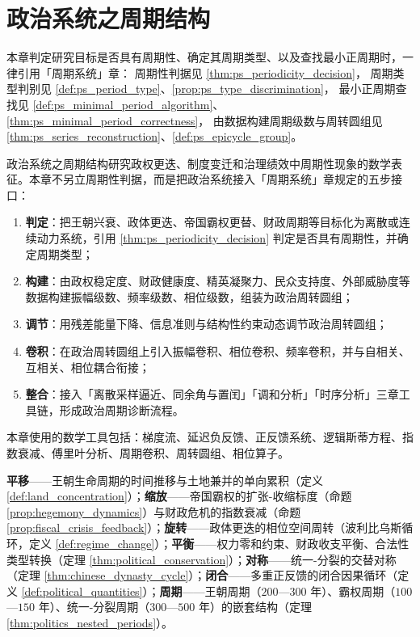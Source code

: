\chapter{政治系统之周期结构}

\begin{remark}[本章目标的周期性判定（引用）]\label{rem:politics_ps_hook}
本章判定研究目标是否具有周期性、确定其周期类型、以及查找最小正周期时，一律引用「周期系统」章：
周期性判据见 \cref{thm:ps_periodicity_decision}，
周期类型判别见 \cref{def:ps_period_type}、\cref{prop:ps_type_discrimination}，
最小正周期查找见 \cref{def:ps_minimal_period_algorithm}、\cref{thm:ps_minimal_period_correctness}，
由数据构建周期级数与周转圆组见 \cref{thm:ps_series_reconstruction}、\cref{def:ps_epicycle_group}。
\end{remark}

\begin{remark}\label{rem:politics_five_steps_positioning}
政治系统之周期结构研究政权更迭、制度变迁和治理绩效中周期性现象的数学表征。本章不另立周期性判据，而是把政治系统接入「周期系统」章规定的五步接口：
\begin{enumerate}[label=(\arabic*)]
    \item \textbf{判定}：把王朝兴衰、政体更迭、帝国霸权更替、财政周期等目标化为离散或连续动力系统，引用 \cref{thm:ps_periodicity_decision} 判定是否具有周期性，并确定周期类型；
    \item \textbf{构建}：由政权稳定度、财政健康度、精英凝聚力、民众支持度、外部威胁度等数据构建振幅级数、频率级数、相位级数，组装为政治周转圆组；
    \item \textbf{调节}：用残差能量下降、信息准则与结构性约束动态调节政治周转圆组；
    \item \textbf{卷积}：在政治周转圆组上引入振幅卷积、相位卷积、频率卷积，并与自相关、互相关、相位耦合衔接；
    \item \textbf{整合}：接入「离散采样逼近、同余角与置闰」「调和分析」「时序分析」三章工具链，形成政治周期诊断流程。
\end{enumerate}
本章使用的数学工具包括：梯度流、延迟负反馈、正反馈系统、逻辑斯蒂方程、指数衰减、傅里叶分析、周期卷积、周转圆组、相位算子。
\end{remark}

\begin{remark}[本章七主题导引]\label{rem:politics_seven_themes}
\textbf{平移}——王朝生命周期的时间推移与土地兼并的单向累积（定义 \ref{def:land_concentration}）；\textbf{缩放}——帝国霸权的扩张-收缩标度（命题 \ref{prop:hegemony_dynamics}）与财政危机的指数衰减（命题 \ref{prop:fiscal_crisis_feedback}）；\textbf{旋转}——政体更迭的相位空间周转（波利比乌斯循环，定义 \ref{def:regime_change}）；\textbf{平衡}——权力零和约束、财政收支平衡、合法性类型转换（定理 \ref{thm:political_conservation}）；\textbf{对称}——统一-分裂的交替对称（定理 \ref{thm:chinese_dynasty_cycle}）；\textbf{闭合}——多重正反馈的闭合因果循环（定义 \ref{def:political_quantities}）；\textbf{周期}——王朝周期（$200$—$300$ 年）、霸权周期（$100$—$150$ 年）、统一-分裂周期（$300$—$500$ 年）的嵌套结构（定理 \ref{thm:politics_nested_periods}）。
\end{remark}

